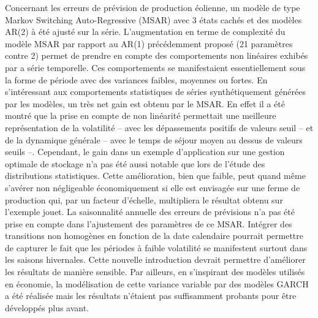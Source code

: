 \documentclass[12pt]{report}
\begin{document}
Concernant les erreurs de prévision de production éolienne, un modèle de type Markov Switching Auto-Regressive (MSAR) avec 3 états cachés et des modèles AR(2) à été ajusté sur la série. L'augmentation en terme de complexité du modèle MSAR par rapport au AR(1) précédemment proposé (21 paramètres contre 2) permet de prendre en compte des comportements non linéaires exhibés par a série temporelle. Ces comportements se manifestaient essentiellement sous la forme de période avec des variances faibles, moyennes ou fortes. En s'intéressant aux comportements statistiques de séries synthétiquement générées par les modèles, un très net gain est obtenu par le MSAR. En effet il a été montré que la prise en compte de non linéarité permettait une meilleure représentation de la volatilité -- avec les dépassements positifs de valeurs seuil -- et de la dynamique générale -- avec le temps de séjour moyen au dessus de valeurs seuils --. Cependant, le gain dans un exemple d'application sur une gestion optimale de stockage n'a pas été aussi notable que lors de l'étude des distributions statistiques. Cette amélioration, bien que faible, peut quand même s'avérer non négligeable économiquement si elle est envisagée sur une ferme de production qui, par un facteur d'échelle, multipliera le résultat obtenu sur l'exemple jouet. La saisonnalité annuelle des erreurs de prévisions n'a pas été prise en compte dans l'ajustement des paramètres de ce MSAR. Intégrer des transitions non homogènes en fonction de la date calendaire pourrait permettre de capturer le fait que les périodes à faible volatilité se manifestent surtout dans les saisons hivernales. Cette nouvelle introduction devrait permettre d'améliorer les résultats de manière sensible. Par ailleurs, en s'inspirant des modèles utilisés en économie, la modélisation de cette variance variable par des modèles GARCH a été réalisée mais les résultats n'étaient pas suffisamment probants pour être développés plus avant.
\end{document}
